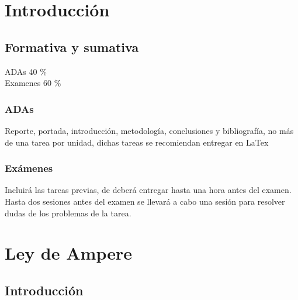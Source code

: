 \documentclass[11pt]{report}
\theoremstyle{plain}
\theoremstyle{definition}
\begin{document}

\tableofcontents


\chapter{Introducción}
\section{Formativa y sumativa}
ADAs 40 \% \\
Examenes 60 \% \\


\subsection{ADAs}
Reporte, portada, introducción, metodología, conclusiones y bibliografía, no más de una tarea por unidad, dichas tareas se recomiendan entregar en LaTex

\subsection{Exámenes}
Incluirá las tareas previas, de deberá entregar hasta una hora antes del examen.\\
Hasta dos sesiones antes del examen se llevará a cabo una sesión para resolver dudas de los problemas de la tarea.



\chapter{Ley de Ampere}


\section{Introducción}
\end{document}
